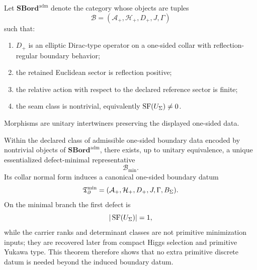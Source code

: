 \begin{definition}
\label{def:admissible-spectral-bordism-category}
Let $\mathbf{SBord}^{\mathrm{adm}}$ denote the category whose objects are tuples
\begin{equation}
\mathcal B=(\mathcal A_+,\mathcal H_+,D_+,J,\Gamma)
\end{equation}
such that:
\begin{enumerate}[label=(\roman*), leftmargin=1.5em, topsep=3pt, itemsep=2pt]
    \item $D_+$ is an elliptic Dirac-type operator on a one-sided collar with reflection-regular
    boundary behavior;
    \item the retained Euclidean sector is reflection positive;
    \item the relative action with respect to the declared reference sector is finite;
    \item the seam class is nontrivial, equivalently $\operatorname{SF}(U_\Sigma)\neq 0$.
\end{enumerate}
Morphisms are unitary intertwiners preserving the displayed one-sided data.
\end{definition}

\begin{theorem}
\label{thm:initial-admissible-bordism}
Within the declared class of admissible one-sided boundary data encoded by nontrivial objects of
$\mathbf{SBord}^{\mathrm{adm}}$, there exists, up to unitary equivalence, a unique essentialized
defect-minimal representative
\begin{equation}
\mathcal B_{\min}.
\end{equation}
Its collar normal form induces a canonical one-sided boundary datum
\begin{equation}
\mathfrak T_{\partial}^{\min}=(\mathcal A_+,\mathcal H_+,D_+,J,\Gamma,B_\Sigma).
\end{equation}
On the minimal branch the first defect is
\begin{equation}
|\operatorname{SF}(U_\Sigma)|=1,
\end{equation}
while the carrier ranks and determinant classes are not primitive minimization inputs; they are
recovered later from compact Higgs selection and primitive Yukawa type. This theorem therefore shows
that no extra primitive discrete datum is needed beyond the induced boundary datum.
\end{theorem}

